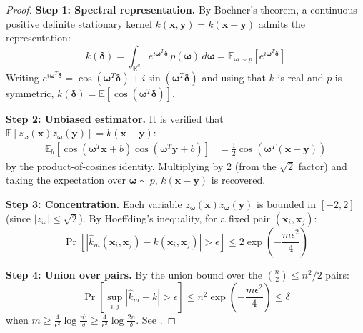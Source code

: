 \begin{proof}
\textbf{Step 1: Spectral representation.} By Bochner's theorem, a continuous positive definite stationary kernel $k(\mathbf{x}, \mathbf{y}) = k(\mathbf{x} - \mathbf{y})$ admits the representation:
\[
k(\boldsymbol{\delta}) = \int_{\mathbb{R}^d} e^{i\boldsymbol{\omega}^T \boldsymbol{\delta}} \, p(\boldsymbol{\omega}) \, d\boldsymbol{\omega} = \mathbb{E}_{\boldsymbol{\omega} \sim p}\!\left[e^{i\boldsymbol{\omega}^T \boldsymbol{\delta}}\right]
\]
Writing $e^{i\boldsymbol{\omega}^T \boldsymbol{\delta}} = \cos(\boldsymbol{\omega}^T \boldsymbol{\delta}) + i\sin(\boldsymbol{\omega}^T \boldsymbol{\delta})$ and using that $k$ is real and $p$ is symmetric, $k(\boldsymbol{\delta}) = \mathbb{E}[\cos(\boldsymbol{\omega}^T \boldsymbol{\delta})]$.

\textbf{Step 2: Unbiased estimator.} It is verified that $\mathbb{E}[z_{\boldsymbol{\omega}}(\mathbf{x}) z_{\boldsymbol{\omega}}(\mathbf{y})] = k(\mathbf{x} - \mathbf{y})$:
\begin{align}
\mathbb{E}_{b}[\cos(\boldsymbol{\omega}^T\mathbf{x}+b)\cos(\boldsymbol{\omega}^T\mathbf{y}+b)] &= \frac{1}{2}\cos(\boldsymbol{\omega}^T(\mathbf{x}-\mathbf{y}))
\end{align}
by the product-of-cosines identity. Multiplying by 2 (from the $\sqrt{2}$ factor) and taking the expectation over $\boldsymbol{\omega} \sim p$, $k(\mathbf{x}-\mathbf{y})$ is recovered.

\textbf{Step 3: Concentration.} Each variable $z_{\boldsymbol{\omega}}(\mathbf{x}) z_{\boldsymbol{\omega}}(\mathbf{y})$ is bounded in $[-2, 2]$ (since $|z_{\boldsymbol{\omega}}| \leq \sqrt{2}$). By Hoeffding's inequality, for a fixed pair $(\mathbf{x}_i, \mathbf{x}_j)$:
\[
\Pr\!\left[|\hat{k}_m(\mathbf{x}_i, \mathbf{x}_j) - k(\mathbf{x}_i, \mathbf{x}_j)| > \epsilon\right] \leq 2\exp\!\left(-\frac{m\epsilon^2}{4}\right)
\]

\textbf{Step 4: Union over pairs.} By the union bound over the $\binom{n}{2} \leq n^2/2$ pairs:
\[
\Pr\!\left[\sup_{i,j} |\hat{k}_m - k| > \epsilon\right] \leq n^2 \exp\!\left(-\frac{m\epsilon^2}{4}\right) \leq \delta
\]
when $m \geq \frac{4}{\epsilon^2}\log\frac{n^2}{\delta} \geq \frac{4}{\epsilon^2}\log\frac{2n}{\delta}$. See \citep{rahimi2007random}.
\end{proof}
